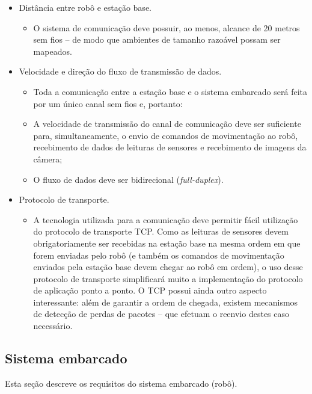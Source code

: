 \begin{itemize} %

  \item Distância entre robô e estação base.
    \begin{itemize}
      \item O sistema de comunicação deve possuir, ao menos, alcance de 20 metros sem fios -- de modo que ambientes de tamanho razoável possam ser mapeados.
    \end{itemize}

  \item Velocidade e direção do fluxo de transmissão de dados.
    \begin{itemize}
      \item Toda a comunicação entre a estação base e o sistema embarcado será feita por um único canal sem fios e, portanto:
      \item A velocidade de transmissão do canal de comunicação deve ser suficiente para, simultaneamente, o envio de comandos de movimentação ao robô, recebimento de dados de leituras de sensores e recebimento de imagens da câmera; 
      \item O fluxo de dados deve ser bidirecional (\textit{full-duplex}).
    \end{itemize}

  \item Protocolo de transporte.
    \begin{itemize}
      \item A tecnologia utilizada para a comunicação deve permitir fácil utilização do protocolo de transporte TCP. Como as leituras de sensores devem obrigatoriamente ser recebidas na estação base na mesma ordem em que forem enviadas pelo robô (e também os comandos de movimentação enviados pela estação base devem chegar ao robô em ordem), o uso desse protocolo de transporte simplificará muito a implementação do protocolo de aplicação ponto a ponto. O TCP possui ainda outro aspecto interessante: além de garantir a ordem de chegada, existem mecanismos de detecção de perdas de pacotes -- que efetuam o reenvio destes caso necessário.
    \end{itemize}

\end{itemize} %



\subsection{Sistema embarcado}
\label{subsec:req_sistema-embarcado}
Esta seção descreve os requisitos do sistema embarcado (robô).


